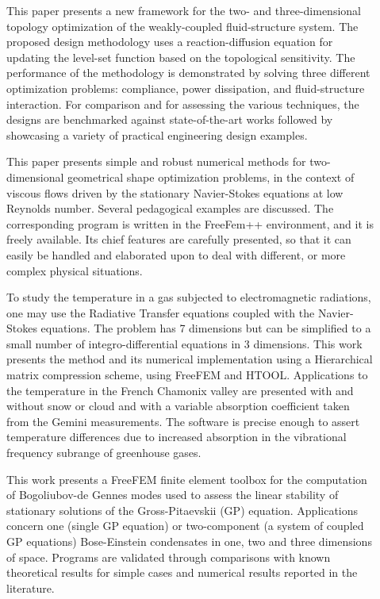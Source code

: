\begin{description}
\item[] This paper presents a new framework for the two- and three-dimensional topology optimization of the weakly-coupled fluid-structure system. The proposed design methodology uses a reaction-diffusion equation for updating the level-set function based on the topological sensitivity. The performance of the methodology is demonstrated by solving three different optimization problems: compliance, power dissipation, and fluid-structure interaction. For comparison and for assessing the various techniques, the designs are benchmarked against state-of-the-art works followed by showcasing a variety of practical engineering design examples.

\item[] This paper presents simple and robust numerical methods for two-dimensional geometrical shape optimization problems, in the context of viscous flows driven by the stationary Navier-Stokes equations at low Reynolds number. Several pedagogical examples are discussed. The corresponding program is written in the FreeFem++ environment, and it is freely available. Its chief features are carefully presented, so that it can easily be handled and elaborated upon to deal with different, or more complex physical situations.

\item[] To study the temperature in a gas subjected to electromagnetic radiations, one may use the Radiative Transfer equations coupled with the Navier-Stokes equations. The problem has 7 dimensions but can be simplified to a small number of integro-differential equations in 3 dimensions. This work presents the method and its numerical implementation using a Hierarchical matrix compression scheme, using FreeFEM and HTOOL. Applications to the temperature in the French Chamonix valley are presented with and without snow or cloud and with a variable absorption coefficient taken from the Gemini measurements. The software is precise enough to assert temperature differences due to increased absorption in the vibrational frequency subrange of greenhouse gases.

\item[] This work presents a FreeFEM finite element toolbox for the computation of Bogoliubov-de Gennes modes used to assess the linear stability of stationary solutions of the Gross-Pitaevskii (GP) equation. Applications concern one (single GP equation) or two-component (a system of coupled GP equations) Bose-Einstein condensates in one, two and three dimensions of space. Programs are validated through comparisons with known theoretical results for simple cases and numerical results reported in the literature.
\end{description}

